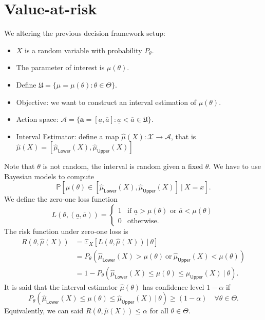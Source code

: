 \section{Value-at-risk}

\begin{example}
    We altering the previous decision framework setup:
    \begin{itemize}
        \item $X$ is a random variable with probability $P_\theta$.
        \item The parameter of interest is $\mu(\theta)$.
        \item Define $\mathfrak{U} = \{ \mu = \mu(\theta) : \theta \in \Theta \}$.
        \item Objective: we want to construct an interval estimation of $\mu(\theta)$.
        \item Action space: $\mathcal{A} = \{ \mathbf{a} = [\underline{a}, \overline{a}] :  \underline{a} < \overline{a} \in \mathfrak{U} \}$.
        \item Interval Estimator: define a map $\hat{\mu}(X) : \mathcal{X} \to \mathcal{A}$, that is 
            $\hat{\mu}(X) = [\hat{\mu}_{\textsf{Lower}}(X), \hat{\mu}_{\textsf{Upper}}(X)]$
    \end{itemize}

    Note that $\theta$ is not random, the interval is random given a fixed $\theta$. We have to use 
    Bayesian models to compute 
    \[
        \mathbb{P} \left[ \mu(\theta) \in [\hat{\mu}_{\textsf{Lower}}(X), \hat{\mu}_{\textsf{Upper}}(X)] \> | \> X = x \right].
    \]
    We define the zero-one loss function
    \[
        L(\theta, (\underline{a}, \overline{a})) = \begin{cases}
            1 & \text{if } \underline{a} > \mu(\theta) \text{ or } \overline{a} < \mu(\theta)\\
            0 & \text{otherwise}.
        \end{cases}
    \]
    The risk function under zero-one loss is 
    \begin{align*}
        R(\theta, \hat{\mu}(X)) &= \mathbb{E}_X[L(\theta, \hat{\mu}(X)) \> | \> \theta]\\
        &= P_\theta \left( \hat{\mu}_{\textsf{Lower}}(X) > \mu(\theta) \> \text{or} \>  
        \hat{\mu}_{\textsf{Upper}}(X) < \mu(\theta) \right)\\
        &= 1 - P_\theta \left( \hat{\mu}_{\textsf{Lower}}(X) \leq \mu(\theta) \leq \hat{\mu}_{\textsf{Upper}}(X) \> | \> \theta \right).
    \end{align*}
    It is said that the interval estimator $\hat{\mu}(\theta)$ has confidence level $1-\alpha$ if 
    \[
    P_\theta \left( \hat{\mu}_{\textsf{Lower}}(X) \leq \mu(\theta) \leq \hat{\mu}_{\textsf{Upper}}(X) \> | \> \theta \right) \geq (1 - \alpha) \quad 
    \forall \theta \in \Theta.
    \]
    Equivalently, we can said $R(\theta, \hat{\mu}(X)) \leq \alpha$ for all $\theta \in \Theta$.
\end{example}

